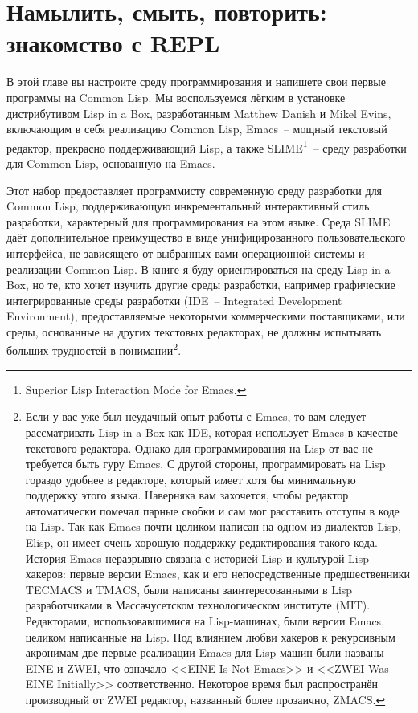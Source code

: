\chapter{Намылить, смыть, повторить: знакомство с REPL}
\label{ch:02}

\thispagestyle{empty}

В этой главе вы настроите среду программирования и напишете свои первые программы на
Common Lisp. Мы воспользуемся лёгким в установке дистрибутивом Lisp in a Box,
разработанным Matthew Danish и Mikel Evins, включающим в себя реализацию
Common Lisp, Emacs~-- мощный текстовый редактор, прекрасно поддерживающий Lisp, а
также SLIME\footnote{Superior Lisp Interaction Mode for Emacs.}~-- среду
разработки для Common Lisp, основанную на Emacs.

Этот набор предоставляет программисту современную среду разработки для Common Lisp,
поддерживающую инкрементальный интерактивный стиль разработки, характерный для
программирования на этом языке. Среда SLIME даёт дополнительное преимущество в виде
унифицированного пользовательского интерфейса, не зависящего от выбранных вами
операционной системы и реализации Common Lisp. В книге я буду ориентироваться на
среду Lisp in a Box, но те, кто хочет изучить другие среды разработки, например
графические интегрированные среды разработки (IDE~-- Integrated Development Environment),
предоставляемые некоторыми коммерческими поставщиками, или среды, основанные на других
текстовых редакторах, не должны испытывать больших трудностей в понимании\footnote{Если у
  вас уже был неудачный опыт работы с Emacs, то вам следует рассматривать Lisp in a Box как
  IDE, которая использует Emacs в качестве текстового редактора.  Однако для программирования
  на Lisp от вас не требуется быть гуру Emacs. С другой стороны, программировать на Lisp
  гораздо удобнее в редакторе, который имеет хотя бы минимальную поддержку этого языка.
  Наверняка вам захочется, чтобы редактор автоматически помечал парные скобки и
  сам мог расставить отступы в коде на Lisp. Так как Emacs почти целиком написан на одном
  из диалектов Lisp, Elisp, он имеет очень хорошую поддержку редактирования такого
  кода. История Emacs неразрывно связана с историей Lisp и культурой Lisp-хакеров: первые
  версии Emacs, как и его непосредственные предшественники TECMACS и
  TMACS, были написаны заинтересованными в Lisp разработчиками в Массачусетском
  технологическом институте (MIT). Редакторами, использовавшимися на Lisp-машинах, были
  версии Emacs, целиком написанные на Lisp. Под влиянием любви хакеров к рекурсивным
  акронимам две первые реализации Emacs для Lisp-машин были названы EINE и
  ZWEI, что означало <<EINE Is Not Emacs>> и <<ZWEI Was EINE Initially>>
  соответственно. Некоторое время был распространён производный от ZWEI редактор,
  названный более прозаично, ZMACS.}.

